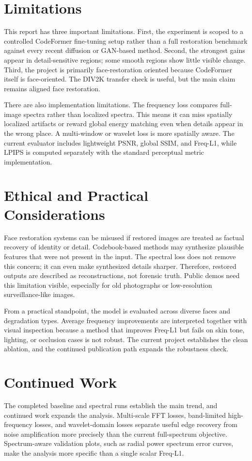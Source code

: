 \documentclass[10pt,twocolumn,letterpaper]{article}
\begin{document}
\section{Limitations}
This report has three important limitations. First, the experiment is scoped to a controlled CodeFormer fine-tuning setup rather than a full restoration benchmark against every recent diffusion or GAN-based method. Second, the strongest gains appear in detail-sensitive regions; some smooth regions show little visible change. Third, the project is primarily face-restoration oriented because CodeFormer itself is face-oriented. The DIV2K transfer check is useful, but the main claim remains aligned face restoration.

There are also implementation limitations. The frequency loss compares full-image spectra rather than localized spectra. This means it can miss spatially localized artifacts or reward global energy matching even when details appear in the wrong place. A multi-window or wavelet loss is more spatially aware. The current evaluator includes lightweight PSNR, global SSIM, and Freq-L1, while LPIPS is computed separately with the standard perceptual metric implementation.

\section{Ethical and Practical Considerations}
Face restoration systems can be misused if restored images are treated as factual recovery of identity or detail. Codebook-based methods may synthesize plausible features that were not present in the input. The spectral loss does not remove this concern; it can even make synthesized details sharper. Therefore, restored outputs are described as reconstructions, not forensic truth. Public demos need this limitation visible, especially for old photographs or low-resolution surveillance-like images.

From a practical standpoint, the model is evaluated across diverse faces and degradation types. Average frequency improvements are interpreted together with visual inspection because a method that improves Freq-L1 but fails on skin tone, lighting, or occlusion cases is not robust. The current project establishes the clean ablation, and the continued publication path expands the robustness check.

\section{Continued Work}
The completed baseline and spectral runs establish the main trend, and continued work expands the analysis. Multi-scale FFT losses, band-limited high-frequency losses, and wavelet-domain losses separate useful edge recovery from noise amplification more precisely than the current full-spectrum objective. Spectrum-aware validation plots, such as radial power spectrum error curves, make the analysis more specific than a single scalar Freq-L1.
\end{document}
